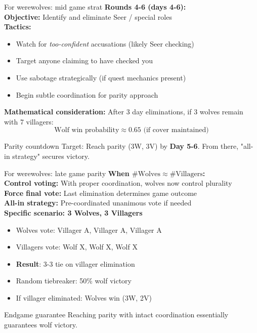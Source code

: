\documentclass[10pt]{beamer}
\begin{document}
\begin{frame}{For werewolves: mid game strat}
  \textbf{Rounds 4-6 (days 4-6):} \\
  \textbf{Objective:} Identify and eliminate Seer / special roles \\
  \textbf{Tactics:}
    \begin{itemize}
      \item Watch for \textit{too-confident} accusations (likely Seer checking)
      \item Target anyone claiming to have checked you
      \item Use sabotage strategically (if quest mechanics present)
      \item Begin subtle coordination for parity approach
    \end{itemize}

  \textbf{Mathematical consideration:}
  After 3 day eliminations, if 3 wolves remain with 7 villagers:
  $$\text{Wolf win probability} \approx 0.65 \text{ (if cover maintained)}$$

  \begin{alertblock}{Parity countdown}
    Target: Reach parity (3W, 3V) by \textbf{Day 5-6}. From there, "all-in strategy" secures victory.
  \end{alertblock}
\end{frame}

\begin{frame}{For werewolves: late game parity}
  \textbf{When $\#\text{Wolves} \approx \#\text{Villagers}$:} \\

  \textbf{Control voting:} With proper coordination, wolves now control plurality \\
  \textbf{Force final vote:} Last elimination determines game outcome \\
  \textbf{All-in strategy:} Pre-coordinated unanimous vote if needed \\

  \textbf{Specific scenario: 3 Wolves, 3 Villagers}
  \begin{itemize}
    \item Wolves vote: Villager A, Villager A, Villager A
    \item Villagers vote: Wolf X, Wolf X, Wolf X
    \item \textbf{Result}: 3-3 tie on villager elimination
    \item Random tiebreaker: 50\% wolf victory
    \item If villager eliminated: Wolves win (3W, 2V)
  \end{itemize}

  \begin{alertblock}{Endgame guarantee}
    Reaching parity with intact coordination essentially guarantees wolf victory.
  \end{alertblock}
\end{frame}
\end{document}
